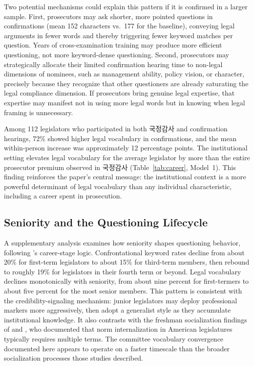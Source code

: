 \documentclass[11pt]{article}
\begin{document}
Two potential mechanisms could explain this pattern if it is confirmed in a larger sample. First, prosecutors may ask shorter, more pointed questions in confirmations (mean 152 characters vs.\ 177 for the baseline), conveying legal arguments in fewer words and thereby triggering fewer keyword matches per question. Years of cross-examination training may produce more efficient questioning, not more keyword-dense questioning. Second, prosecutors may strategically allocate their limited confirmation hearing time to non-legal dimensions of nominees, such as management ability, policy vision, or character, precisely because they recognize that other questioners are already saturating the legal compliance dimension. If prosecutors bring genuine legal expertise, that expertise may manifest not in using more legal words but in knowing when legal framing is unnecessary.

Among 112 legislators who participated in both 국정감사 and confirmation hearings, 72\% showed higher legal vocabulary in confirmations, and the mean within-person increase was approximately 12 percentage points. The institutional setting elevates legal vocabulary for the average legislator by more than the entire prosecutor premium observed in 국정감사 (Table~\ref{tab:career}, Model~1). This finding reinforces the paper's central message: the institutional context is a more powerful determinant of legal vocabulary than any individual characteristic, including a career spent in prosecution.

\subsection{Seniority and the Questioning Lifecycle}

A supplementary analysis examines how seniority shapes questioning behavior, following \citet{bailer2021}'s career-stage logic. Confrontational keyword rates decline from about 20\% for first-term legislators to about 15\% for third-term members, then rebound to roughly 19\% for legislators in their fourth term or beyond. Legal vocabulary declines monotonically with seniority, from about nine percent for first-termers to about five percent for the most senior members. This pattern is consistent with the credibility-signaling mechanism: junior legislators may deploy professional markers more aggressively, then adopt a generalist style as they accumulate institutional knowledge. It also contrasts with the freshman socialization findings of \citet{asher1973} and \citet{crook1985}, who documented that norm internalization in American legislatures typically requires multiple terms. The committee vocabulary convergence documented here appears to operate on a faster timescale than the broader socialization processes those studies described.
\end{document}
